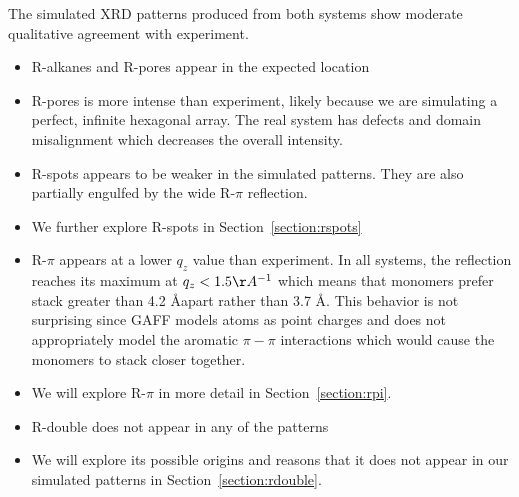 \documentclass{article}
\begin{document}
  The simulated XRD patterns produced from both systems show moderate qualitative 
  agreement with experiment. 
  \begin{itemize}
  		\item R-alkanes and R-pores appear in the expected location
  		\item R-pores is more intense than experiment, likely because we are simulating a 
		perfect, infinite hexagonal array. The real system has defects and domain misalignment
	    which decreases the overall intensity.
    	\item R-spots appears to be weaker in the simulated patterns. They are also partially 
	    engulfed by the wide R-$\pi$ reflection.
	    \item We further explore R-spots in Section~\ref{section:rspots}  
        \item R-$\pi$ appears at a lower $q_z$ value than experiment. In all systems, the
	    reflection reaches its maximum at $q_z < 1.5 \AA^{-1}$ which means that monomers
	    prefer stack greater than 4.2 \AA apart rather than 3.7 \AA. This behavior is not
	    surprising since GAFF models atoms as point charges and does not appropriately model 
	    the aromatic $\pi-\pi$ interactions which would cause the monomers to stack closer
	    together.
	    \item We will explore R-$\pi$ in more detail in Section~\ref{section:rpi}.
	    \item R-double does not appear in any of the patterns
	    \item We will explore its possible origins and reasons that it does not appear in our
	    simulated patterns in Section~\ref{section:rdouble}.
  \end{itemize}
  
\end{document}
